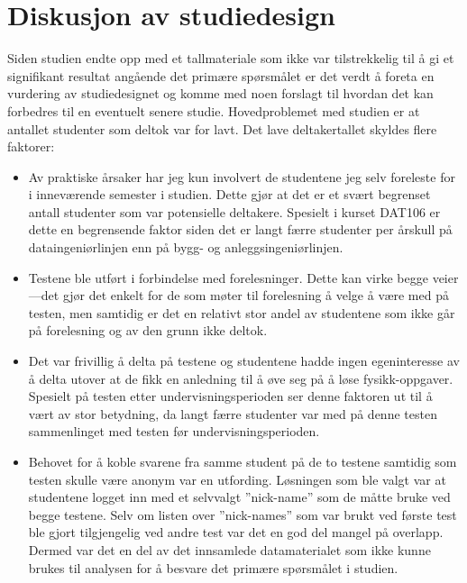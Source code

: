 \documentclass[a4paper,norsk,12pt]{article}
\begin{document}
\section{Diskusjon av studiedesign}
\label{sec:studiedesign}
Siden studien endte opp med et tallmateriale som ikke var tilstrekkelig til å gi et signifikant resultat angående det primære spørsmålet er det verdt å foreta en vurdering av studiedesignet og komme med noen forslagt til hvordan det kan forbedres til en eventuelt senere studie. Hovedproblemet med studien er at antallet studenter som deltok var for lavt. Det lave deltakertallet skyldes flere faktorer:
\begin{itemize}
\item
Av praktiske årsaker har jeg kun involvert de studentene jeg selv foreleste for i inneværende semester i studien. Dette gjør at det er et svært begrenset antall studenter som var potensielle deltakere. Spesielt i kurset DAT106 er dette en begrensende faktor siden det er langt færre studenter per årskull på dataingeniørlinjen enn på bygg- og anleggsingeniørlinjen.
\item
Testene ble utført i forbindelse med forelesninger. Dette kan virke begge veier---det gjør det enkelt for de som møter til forelesning å velge å være med på testen, men samtidig er det en relativt stor andel av studentene som ikke går på forelesning og av den grunn ikke deltok.
\item
Det var frivillig å delta på testene og studentene hadde ingen egeninteresse av å delta utover at de fikk en anledning til å øve seg på å løse fysikk-oppgaver.  Spesielt på testen etter undervisningsperioden ser denne faktoren ut til å vært av stor betydning, da langt færre studenter var med på denne testen sammenlinget med testen før undervisningsperioden.
\item
Behovet for å koble svarene fra samme student på de to testene samtidig som testen skulle være anonym var en utfording. Løsningen som ble valgt var at studentene logget inn med et selvvalgt ''nick-name'' som de måtte bruke ved begge testene. Selv om listen over ''nick-names'' som var brukt ved første test ble gjort tilgjengelig ved andre test var det en god del mangel på overlapp. Dermed var det en del av det innsamlede datamaterialet som ikke kunne brukes til analysen for å besvare det primære spørsmålet i studien.
\end{itemize}
\end{document}
